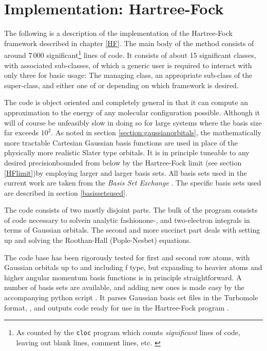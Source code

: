 \documentclass[../../master.tex]{subfiles}
\begin{document}
\chapter{Implementation: Hartree-Fock\label{HFI}}
The following is a description of the implementation of the Hartree-Fock framework described in chapter \ref{HF}. The main body of the method consists of around $7\,000$ significant\footnote{As counted by the \lstinline{cloc} program which counts \emph{significant} lines of code, leaving out blank lines, comment lines, etc. \cite{cloc}} lines of \CC{}  code. It consists of about 15 significant classes, with associated sub-classes, of which a generic user is required to interact with only three for basic usage: The managing  class, an appropriate sub-class of the  super-class, and either one of  or  depending on which framework is desired.

The code is object oriented and completely general in that it can compute an approximation to the energy of any molecular configuration possible. Although it will of course be unfeasibly slow in doing so for large systems where the basis size far exceeds $10^2$. As noted in section \ref{section:gaussianorbitals}, the mathematically more tractable Cartesian Gaussian basis functions are used in place of the physically more realistic Slater type orbitals. It is in principle tuneable to any desired precision\textemdash bounded from below by the Hartree-Fock limit (see section \ref{HFlimit})\textemdash by employing larger and larger basis sets. All basis sets used in the current work are taken from the \emph{Basis Set Exchange} \cite{basissetexchange}. The specific basis sets used are described in section \ref{basissetsused}.

The code consists of two mostly disjoint parts. The bulk of the program consists of code necessary to solve\textemdash in analytic fashion\textemdash one-, and two-electron integrals in terms of Gaussian orbitals. The second and more succinct part deals with setting up and solving the Roothan-Hall (Pople-Nesbet) equations. 


The code base has been rigorously tested for first and second row atoms, with Gaussian orbitals up to and including f type, but expanding to heavier atoms and higher angular momentum basis functions is in principle straightforward. A number of basis sets are available, and adding new ones is made easy by the accompanying python script . It parses Gaussian basis set files in the Turbomole format, , and outputs \CC{}  code ready for use in the Hartree-Fock program \cite{TURBOMOLE}. 
\end{document}
